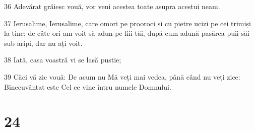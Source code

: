 \par 36 Adevărat grăiesc vouă, vor veni acestea toate asupra acestui neam.
\par 37 Ierusalime, Ierusalime, care omori pe prooroci și cu pietre ucizi pe cei trimiși la tine; de câte ori am voit să adun pe fiii tăi, după cum adună pasărea puii săi sub aripi, dar nu ați voit.
\par 38 Iată, casa voastră vi se lasă pustie;
\par 39 Căci vă zic vouă: De acum nu Mă veți mai vedea, până când nu veți zice: Binecuvântat este Cel ce vine întru numele Domnului.

\chapter{24}

